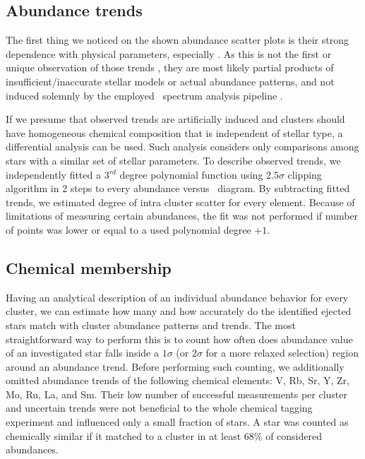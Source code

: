 \subsection{Abundance trends}
\label{sec:abund_trends}
The first thing we noticed on the shown abundance scatter plots is their strong dependence with physical parameters, especially \Teff. As this is not the first or unique observation of those trends \citep{2010A&A...523A..71G, 2013ApJ...775...58B, 2016MNRAS.457.3934L, 2018A&A...619A.176B, 2019arXiv191208539C}, they are most likely partial products of insufficient/inaccurate stellar models or actual abundance patterns, and not induced solemnly by the employed \SME\ spectrum analysis pipeline \citep[][]{buder2020}.

If we presume that observed trends are artificially induced and clusters should have homogeneous chemical composition that is independent of stellar type, a differential analysis can be used. Such analysis considers only comparisons among stars with a similar set of stellar parameters. To describe observed trends, we independently fitted a 3$^{rd}$ degree polynomial function using $2.5\sigma$ clipping algorithm in 2 steps to every abundance versus \Teff\ diagram. By subtracting fitted trends, we estimated degree of intra cluster scatter for every element. Because of limitations of measuring certain abundances, the fit was not performed if number of points was lower or equal to a used polynomial degree $+1$.


\subsection{Chemical membership}
\label{sec:chem_ej_tag}
Having an analytical description of an individual abundance behavior for every cluster, we can estimate how many and how accurately do the identified ejected stars match with cluster abundance patterns and trends. The most straightforward way to perform this is to count how often does abundance value of an investigated star falls inside a $1\sigma$ (or $2\sigma$ for a more relaxed selection) region around an abundance trend. Before performing such counting, we additionally omitted abundance trends of the following chemical elements: V, Rb, Sr, Y, Zr, Mo, Ru, La, and Sm. Their low number of successful measurements per cluster and uncertain trends were not beneficial to the whole chemical tagging experiment and influenced only a small fraction of stars.  A star was counted as chemically similar if it matched to a cluster in at least $68$\% of considered abundances.

